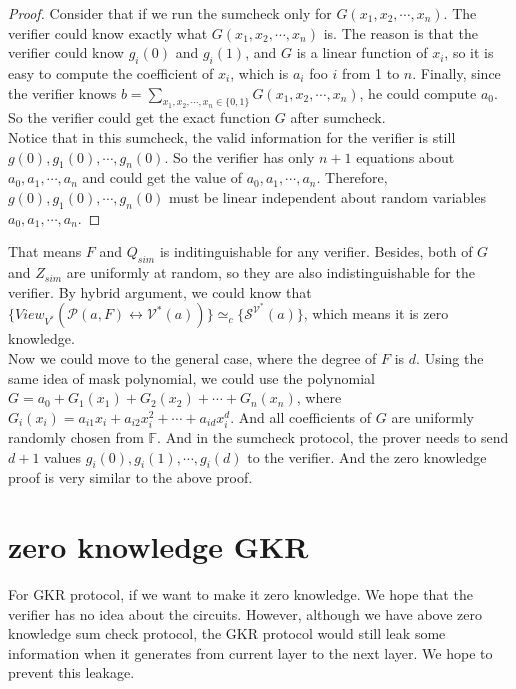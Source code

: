 \begin{proof}
Consider that if we run the sumcheck only for $G(x_1, x_2, \cdots, x_n)$. The verifier could know exactly what $G(x_1, x_2, \cdots, x_n)$ is. The reason is that the verifier could know $g_{i}(0)$ and $g_{i}(1)$, and $G$ is a linear function of $x_i$, so it is easy to compute the coefficient of $x_i$, which is $a_i$ foo $i$ from 1 to $n$. Finally, since the verifier knows $b = \sum\limits_{x_1, x_2, \cdots, x_n \in \{0, 1\}}G(x_1, x_2, \cdots, x_n)$, he could compute $a_0$. So the verifier could get the exact function $G$ after sumcheck.\\  

Notice that in this sumcheck, the valid information for the verifier is still $g(0), g_{1}(0), \cdots, g_{n}(0)$. So the verifier has only $n + 1$ equations about $a_0, a_1, \cdots, a_n$ and could get the value of $a_0, a_1, \cdots, a_n$. Therefore, $g(0), g_{1}(0), \cdots, g_{n}(0)$ must be linear independent about random variables $a_0, a_1, \cdots, a_n$.
\end{proof}

That means $F$ and $Q_{sim}$ is inditinguishable for any verifier. Besides, both of $G$ and $Z_{sim}$ are uniformly at random, so they are also indistinguishable for the verifier. By hybrid argument, we could know that $\{View_{V^*}(\mathcal{P}(a, F) \leftrightarrow \mathcal{V^*}(a))\} \simeq_{c} \{\mathcal{S}^{\mathcal{V^*}}(a)\}$, which means it is zero knowledge.\\

\noindent
Now we could move to the general case, where the degree of $F$ is $d$. Using the same idea of mask polynomial, we could use the polynomial $G = a_{0} + G_1(x_1) + G_2(x_2) + \cdots + G_n(x_n)$, where $G_{i}(x_i) = a_{i1}x_i + a_{i2}x_i^2 + \cdots + a_{id}x_i^d$. And all coefficients of $G$ are uniformly randomly chosen from $\mathbb{F}$. And in the sumcheck protocol, the prover needs to send $d+1$ values $g_{i}(0), g_{i}(1), \cdots, g_i(d)$ to the verifier. And the zero knowledge proof is very similar to the above proof. 

\section{zero knowledge GKR}

For GKR protocol, if we want to make it zero knowledge. We hope that the verifier has no idea about the circuits. However, although we have above zero knowledge sum check protocol, the GKR protocol would still leak some information when it generates from current layer to the next layer. We hope to prevent this leakage.\\

